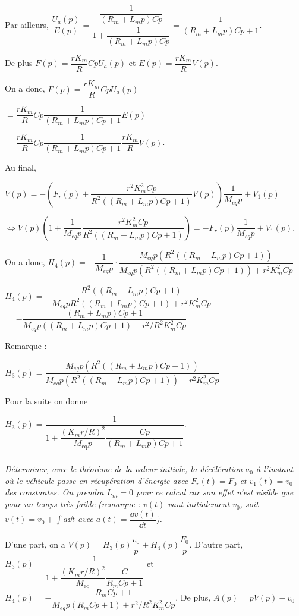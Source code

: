\documentclass[10pt,fleqn]{article} %
\begin{document}
\begin{multicols}{2}
\begin{corrige}
Par ailleurs, $\dfrac{U_a(p)}{E(p)}=\dfrac{\dfrac{1}{\left(R_m + L_m p \right)Cp}}{1+\dfrac{1}{\left(R_m + L_m p \right)Cp}}=\dfrac{1}{\left(R_m + L_m p \right)Cp+1}$.


De plus $F(p)=\dfrac{rK_m}{R}Cp U_a (p)$ et $E(p)=\dfrac{rK_m}{R} V(p)$.


On a donc, $F(p)=\dfrac{rK_m}{R}Cp U_a (p)$
 
$= \dfrac{rK_m}{R}Cp \dfrac{1}{\left(R_m + L_m p \right)Cp+1} E(p)$ 

$= \dfrac{rK_m}{R}Cp \dfrac{1}{\left(R_m + L_m p \right)Cp+1} \dfrac{rK_m}{R} V(p)$.


Au final, 

$V(p)=-\left( F_r(p)  + \dfrac{r^2K_m^2Cp}{R^2\left(\left(R_m + L_m p \right)Cp+1\right)}  V(p)\right)\dfrac{1}{M_{eq}p} + V_1(p)$ 

$\Leftrightarrow V(p)\left(1+ \dfrac{1}{M_{eq}p} \dfrac{r^2K_m^2Cp}{R^2\left(\left(R_m + L_m p \right)Cp+1\right)}\right)=-F_r(p)  \dfrac{1}{M_{eq}p} + V_1(p)$.

On a donc, 
$H_4(p)=-\dfrac{1}{M_{eq}p}\cdot\dfrac{M_{eq}p \left( R^2\left(\left(R_m + L_m p \right)Cp+1\right) \right)}{M_{eq}p \left( R^2\left(\left(R_m + L_m p \right)Cp+1\right) \right)+r^2K_m^2Cp}$ 

$H_4(p)=-\dfrac{R^2\left(\left(R_m + L_m p \right)Cp+1\right) }{M_{eq}p  R^2\left(\left(R_m + L_m p \right)Cp+1\right) +r^2K_m^2Cp}$
$=-\dfrac{\left(R_m + L_m p \right)Cp+1 }{M_{eq}p  \left(\left(R_m + L_m p \right)Cp+1\right) +r^2/R^2 K_m^2Cp}$


Remarque : 

$H_3(p)=\dfrac{M_{eq}p \left( R^2\left(\left(R_m + L_m p \right)Cp+1\right) \right)}{M_{eq}p \left( R^2\left(\left(R_m + L_m p \right)Cp+1\right) \right)+r^2K_m^2Cp}$ 


\end{corrige}
\else
\fi

Pour la suite on donne

$H_3(p)=\dfrac{1}{1+\dfrac{\left(K_m r/R\right)^2}{M_{\text{eq}}p}\dfrac{Cp}{\left(R_m + L_m p\right)Cp+1}}$.






\subparagraph{}
\textit{Déterminer, avec le théorème de la valeur initiale, la décélération $a_0$ à l’instant où le véhicule passe en récupération d’énergie avec $F_r (t) = F_0$ et $v_1(t) = v_0$ des constantes. On prendra $L_m = 0$ pour ce calcul car son effet n’est visible que pour un temps très faible (remarque : $v(t)$ vaut initialement $v_0$, soit $v(t) = v_0 + \int a \dd t$ avec
$a(t)=\dfrac{\dd v(t)}{\dd t}$).}
\ifprof
\begin{corrige}
D'une part, on a $V(p) = H_3(p) \dfrac{v_0}{p} + H_4(p) \dfrac{F_0}{p}$.  D'autre part, 
$H_3(p)=\dfrac{1}{1+\dfrac{\left(K_m r/R\right)^2}{M_{\text{eq}}}\dfrac{C}{R_m Cp+1}}$ et 
$H_4(p)=-\dfrac{R_mCp+1 }{M_{eq}p  \left(R_m  Cp+1\right) +r^2/R^2 K_m^2Cp}$. De plus, $A(p)=pV(p)-v_0$


\end{corrige}
\end{multicols}
\end{document}
